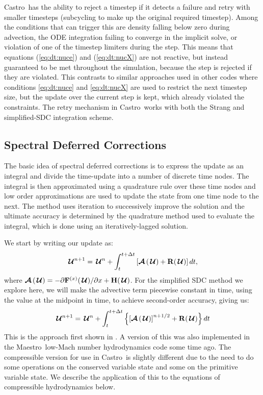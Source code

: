 \documentclass[times,modern]{aastex63}
\newcommand{\castro}{{\sf Castro}}
\newcommand{\maestro}{{\sf Maestro}}
\newcommand{\Uc}{{\,\bm{\mathcal{U}}}}
\newcommand{\Fb}{\mathbf{F}}
\newcommand{\xv}{{(x)}}
\newcommand{\Hb}{{\bf H}}
\newcommand{\Rb}{{\bf R}}
\newcommand{\Adv}[1]{{\left [\boldsymbol{\mathcal{A}} \left(#1\right)\right]}}
\newcommand{\Advs}[1]{\boldsymbol{\mathcal{A}} \left(#1\right)}
\newcommand{\MarginPar}[1]{\marginpar{\vskip-\baselineskip\raggedright\tiny\sffamily\hrule\smallskip{\color{red}#1}\par\smallskip\hrule}}
\begin{document}
\castro\ has the ability to reject a timestep if it detects a failure
and retry with smaller timesteps (subcycling to make up the original
required timestep).  Among the conditions that can trigger this are
density falling below zero during advection, the ODE integration
failing to converge in the implicit solve, or violation of one of the
timestep limiters during the step.  This means that equations
(\ref{eq:dt:nuce}) and (\ref{eq:dt:nucX}) are not reactive, but instead
guaranteed to be met throughout the simulation, because the step is
rejected if they are violated.  This contrasts to similar approaches
used in other codes where conditions \ref{eq:dt:nuce} and
\ref{eq:dt:nucX} are used to restrict the next timestep size, but the
update over the current step is kept, which already violated the
constraints. \MarginPar{would be nice to have a reference here} The retry mechanism in \castro\ works with both the
Strang and simplified-SDC integration scheme.


\subsection{Spectral Deferred Corrections}

The basic idea of spectral deferred corrections is to express the
update as an integral and divide the time-update into a number of
discrete time nodes.  The integral is then approximated using a
quadrature rule over these time nodes and low order approximations are
used to update the state from one time node to the next.  The method
uses iteration to successively improve the solution and the ultimate
accuracy is determined by the quadrature method used to evaluate the
integral, which is done using an iteratively-lagged solution.

We start by writing our update as:
\begin{equation}
\Uc^{n+1} = \Uc^n + \int_t^{t+\Delta t} \left [ \Advs{\Uc} + \Rb(\Uc) \right ] dt,
\end{equation}
where $\Advs{\Uc} =  -{\partial \Fb^\xv (\Uc)}/{\partial x} + \Hb(\Uc)$.
For the simplified SDC method we explore here, we will make the
advective term piecewise constant in time, using the value at the
midpoint in time, to achieve second-order accuracy, giving us:
\begin{equation}
\label{eq:integral:simplesdc}
\Uc^{n+1} = \Uc^n + \int_t^{t+\Delta t} \left \{ \Adv{\Uc}^{n+1/2} + \Rb(\Uc) \right \} dt
\end{equation}
This is the approach first shown in \citep{SDC-old}.  A
version of this was also implemented in the \maestro\ low-Mach number
hydrodynamics code some time ago.  The compressible version for use in
\castro\ is slightly different due to the need to do some operations
on the conserved variable state and some on the primitive variable
state.  We describe the application of this to the equations of
compressible hydrodynamics below.
\end{document}
